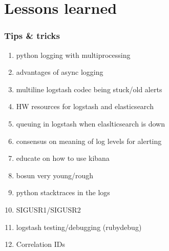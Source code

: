 \documentclass[13pt, ignorenonframetext]{beamer}
\begin{document}
\section{Lessons learned}
\begin{frame}
\frametitle{Tips \& tricks}
\begin{enumerate}
\item python logging with multiprocessing
\item advantages of async logging
\item multiline logstash codec being stuck/old alerts
\item HW resources for logstash and elasticsearch
\item queuing in logstash when elaslticsearch is down
\item consensus on meaning of log levels for alerting
\item educate on how to use kibana
\item bosun very young/rough
\item python stacktraces in the logs
\item SIGUSR1/SIGUSR2
\item logstash testing/debugging (rubydebug)
\item Correlation IDs
\end{enumerate}
\end{frame}


\end{document}
